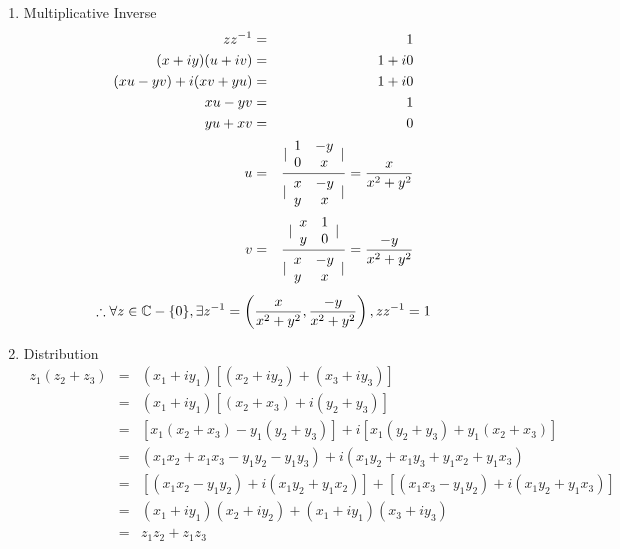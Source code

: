 \documentclass[letterpaper,12pt,fleqn]{article}
\begin{document}
\begin{theproof}
\begin{enumerate}
\item Multiplicative Inverse
\allowdisplaybreaks
\begin{eqnarray*}
zz^{-1} &=& 1 \\
(x+iy)(u+iv) &=& 1+i0 \\
(xu-yv)+i(xv+yu) &=& 1+i0 \\
xu-yv &=& 1 \\
yu+xv &=& 0 \\
u &=& \frac{\lvert\begin{array}{cc}1 & -y \\ 0 & x\end{array}\rvert}
    {\lvert\begin{array}{cc}x & -y \\ y & x\end{array}\rvert}=\frac{x}{x^2+y^2} \\
v &=& \frac{\lvert\begin{array}{cc}x & 1 \\ y & 0\end{array}\rvert}
    {\lvert\begin{array}{cc}x & -y \\ y & x\end{array}\rvert}=\frac{-y}{x^2+y^2} \\
\end{eqnarray*}
\[\therefore \forall z\in\mathbb{C}-\{0\},
    \exists z^{-1}=\left(\frac{x}{x^2+y^2},\frac{-y}{x^2+y^2}\right),zz^{-1}=1\]

\item Distribution
\begin{eqnarray*}
z_1(z_2+z_3) &=& (x_1+iy_1)[(x_2+iy_2)+(x_3+iy_3)] \\
    &=& (x_1+iy_1)[(x_2+x_3)+i(y_2+y_3)] \\
    &=& [x_1(x_2+x_3)-y_1(y_2+y_3)]+i[x_1(y_2+y_3)+y_1(x_2+x_3)] \\
    &=& (x_1x_2+x_1x_3-y_1y_2-y_1y_3)+i(x_1y_2+x_1y_3+y_1x_2+y_1x_3) \\
    &=& [(x_1x_2-y_1y_2)+i(x_1y_2+y_1x_2)]+[(x_1x_3-y_1y_2)+i(x_1y_2+y_1x_3)] \\
    &=& (x_1+iy_1)(x_2+iy_2)+(x_1+iy_1)(x_3+iy_3) \\
    &=& z_1z_2+z_1z_3 \\
\end{eqnarray*}
\end{enumerate}
\end{theproof}
\end{document}
